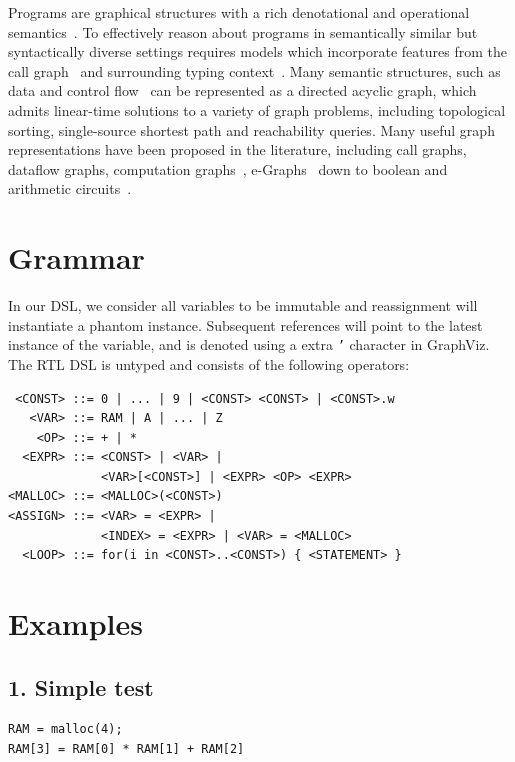 \documentclass[sigplan,10pt,review,anonymous]{acmart}
\begin{document}
Programs are graphical structures with a rich denotational and operational semantics~\cite{henkel2018code}. To effectively reason about programs in semantically similar but syntactically diverse settings requires models which incorporate features from the call graph~\cite{liu2019neural} and surrounding typing context~\cite{allamanis2017learning}. Many semantic structures, such as data and control flow~\cite{si2018learning} can be represented as a directed acyclic graph, which admits linear-time solutions to a variety of graph problems, including topological sorting, single-source shortest path and reachability queries. Many useful graph representations have been proposed in the literature, including call graphs, dataflow graphs, computation graphs~\citep{breuleux2017automatic}, e-Graphs~\citep{willsey2020egg} down to boolean and arithmetic circuits~\citep{miller1988efficient}.


\pagebreak\appendix

\section{Grammar}
In our DSL, we consider all variables to be immutable and reassignment will instantiate a phantom instance. Subsequent references will point to the latest instance of the variable, and is denoted using a extra \texttt{'} character in GraphViz. The RTL DSL is untyped and consists of the following operators:

\begin{lstlisting}
 <CONST> ::= 0 | ... | 9 | <CONST> <CONST> | <CONST>.w
   <VAR> ::= RAM | A | ... | Z
    <OP> ::= + | *
  <EXPR> ::= <CONST> | <VAR> |
             <VAR>[<CONST>] | <EXPR> <OP> <EXPR>
<MALLOC> ::= <MALLOC>(<CONST>)
<ASSIGN> ::= <VAR> = <EXPR> |
             <INDEX> = <EXPR> | <VAR> = <MALLOC>
  <LOOP> ::= for(i in <CONST>..<CONST>) { <STATEMENT> }
\end{lstlisting}
\normalsize

\section{Examples}
\subsection*{1. Simple test}

\begin{lstlisting}
RAM = malloc(4);
RAM[3] = RAM[0] * RAM[1] + RAM[2]
\end{lstlisting}
\end{document}
